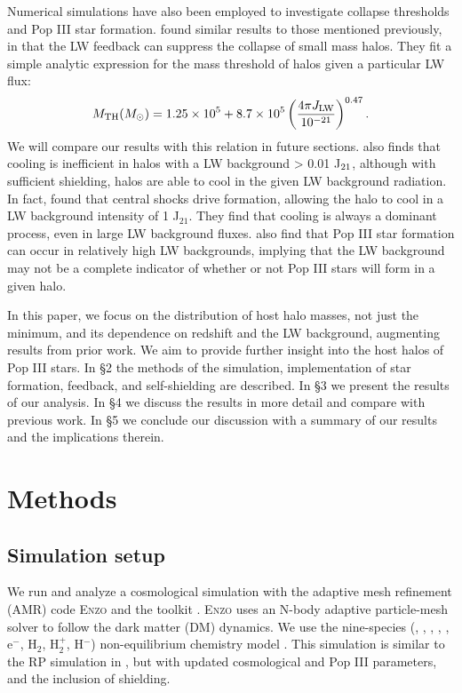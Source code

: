 \documentclass[a4paper,fleqn,usenatbib]{mnras}
\begin{document}
Numerical simulations have also been employed to investigate collapse thresholds and Pop III star formation. \citet[hereafter M01]{Machacek01} found similar results to those mentioned previously, in that the LW feedback can suppress the collapse of small mass halos. They fit a simple analytic expression for the mass threshold of halos given a particular LW flux:
\begin{equation} \label{mthresh}
	M_{\rm TH} ( M_{\odot} ) = 1.25 \times 10^{5} + 8.7  \times 10^{5} \left( \frac{4 \pi J_{\rm LW}}{10^{-21}} \right)^{0.47} .
\end{equation}
We will compare our results with this relation in future sections. \citet{Yoshida03} also finds that cooling is inefficient in halos with a LW background > 0.01 J$_{\rm 21}$, although with sufficient \hh{} shielding, halos are able to cool in the given LW background radiation. In fact, \citet{Wise07_UVB} found that central shocks drive \hh{} formation, allowing the halo to cool in a LW background intensity of 1 J$_{21}$. They find that \hh{} cooling is always a dominant process, even in large LW background fluxes. \citet{OShea08} also find that Pop III star formation can occur in relatively high LW backgrounds, implying that the LW background may not be a complete indicator of whether or not Pop III stars will form in a given halo.    

In this paper, we focus on the distribution of host halo masses, not just the minimum, and its dependence on redshift and the LW background, augmenting results from prior work. We aim to provide further insight into the host halos of Pop III stars. In \S 2 the methods of the simulation, implementation of star formation, feedback, and \hh{} self-shielding are described. In \S 3 we present the results of our analysis. In \S 4 we discuss the results in more detail and compare with previous work. In \S 5 we conclude our discussion with a summary of our results and the implications therein.

\section{Methods}
\subsection{Simulation setup}
We run and analyze a cosmological simulation with the adaptive mesh refinement (AMR) code \textsc{Enzo} \citep{Enzo} and the toolkit \yt{} \citep{yt_full_paper}. \textsc{Enzo} uses an N-body adaptive particle-mesh solver \citep{Efstathiou85, Couchman91} to follow the dark matter (DM) dynamics. We use the nine-species (\hi, \hii, \hei, \heii, \heiii, e$^{-}$, H$_{2}$, H$_{2}^{+}$, H$^{-}$) non-equilibrium chemistry model \citep{Abel97, Anninos97}. This simulation is similar to the RP simulation in \citet[hereafter W12]{Wise12_RP}, but with updated cosmological and Pop III parameters, and the inclusion of \hh{} shielding.
\end{document}
